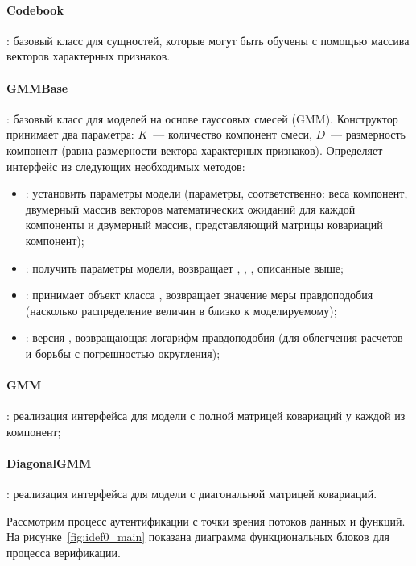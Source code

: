 \paragraph{Codebook}: базовый класс для сущностей, которые могут быть обучены с помощью массива векторов характерных признаков.

\paragraph{GMMBase}: базовый класс для моделей на основе гауссовых смесей (GMM). Конструктор принимает два параметра: $K$~--- количество компонент смеси, $D$~--- размерность компонент (равна размерности вектора характерных признаков). Определяет интерфейс из следующих необходимых методов:
\begin{itemize}
\item {}: установить параметры модели (параметры, соответственно: веса компонент, двумерный массив векторов математических ожиданий для каждой компоненты и двумерный массив, представляющий матрицы ковариаций компонент);
\item {}: получить параметры модели, возвращает , , , описанные выше;
\item {}: принимает объект класса , возвращает значение меры правдоподобия (насколько распределение величин в  близко к моделируемому);
\item {}: версия , возвращающая логарифм правдоподобия (для облегчения расчетов и борьбы с погрешностью округления);
\end{itemize}

\paragraph{GMM}: реализация интерфейса  для модели с полной матрицей ковариаций у каждой из компонент;

\paragraph{DiagonalGMM}: реализация интерфейса  для модели с диагональной матрицей ковариаций.

Рассмотрим процесс аутентификации с точки зрения потоков данных и функций. На
рисунке~\ref{fig:idef0_main} показана диаграмма функциональных блоков для
процесса верификации.

